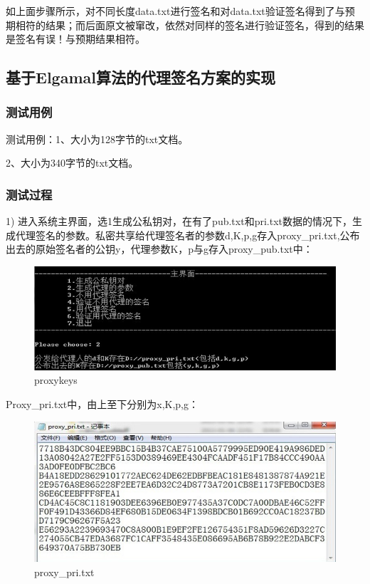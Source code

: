 如上面步骤所示，对不同长度data.txt进行签名和对data.txt验证签名得到了与预期相符的结果；而后面原文被窜改，依然对同样的签名进行验证签名，得到的结果是签名有误！与预期结果相符。

\subsection{基于Elgamal算法的代理签名方案的实现}

\subsubsection{测试用例}

测试用例：1、大小为128字节的txt文档。

          2、大小为340字节的txt文档。

\subsubsection{测试过程}

1)  进入系统主界面，选1生成公私钥对，在有了pub.txt和pri.txt数据的情况下，生成代理签名的参数。私密共享给代理签名者的参数d,K,p,g存入proxy\_pri.txt,公布出去的原始签名者的公钥y，代理参数K，p与g存入proxy\_pub.txt中：

\begin{figure}[H]
\centering
\includegraphics{img/21.jpg}
\caption{proxykeys}
\end{figure}

Proxy\_pri.txt中，由上至下分别为x,K,p,g：

\begin{figure}[H]
\centering
\includegraphics{img/22.jpg}
\caption{proxy\_pri.txt}
\end{figure}

